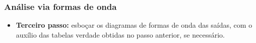 \documentclass{beamer}
\begin{document}
\begin{frame}
\frametitle{Análise via formas de onda}

\begin{itemize}
\item \textbf{Terceiro passo: } esboçar os diagramas de formas de onda das saídas, com o auxílio das tabelas verdade obtidas no passo anterior, se necessário.
\end{itemize}
\begin{center}
%
%
%

\end{center}
\end{frame}
\end{document}
